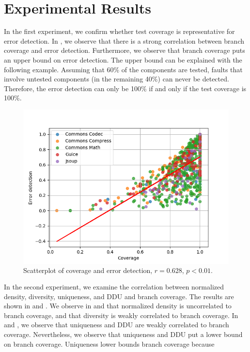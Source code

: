 \documentclass[twoside,a4paper,11pt]{memoir}
\begin{document}
\section{Experimental Results}
In the first experiment, we confirm whether test coverage is representative for error detection.
In , we observe that there is a strong correlation between branch coverage and error detection.
Furthermore, we observe that branch coverage puts an upper bound on error detection.
The upper bound can be explained with the following example.
Assuming that 60\% of the components are tested, faults that involve untested components (in the remaining 40\%) can never be detected.
Therefore, the error detection can only be 100\% if and only if the test coverage is 100\%.
\begin{figure}
  \includegraphics[width=\linewidth]{figures/coverage_error_detection}
  \caption{Scatterplot of coverage and error detection, $r = 0.628$, $p < 0.01$.}
  \label{fig:coverage_error_detection}
\end{figure}

In the second experiment, we examine the correlation between normalized density, diversity, uniqueness, and DDU and branch coverage.
The results are shown in  and .
We observe in  and  that normalized density is uncorrelated to branch coverage, and that diversity is weakly correlated to branch coverage.
In  and , we observe that uniqueness and DDU are weakly correlated to branch coverage.
Nevertheless, we observe that uniqueness and DDU put a lower bound on branch coverage.
Uniqueness lower bounds branch coverage because
\end{document}
